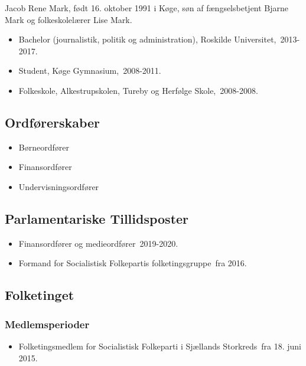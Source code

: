 \documentclass[11pt, a4paper]{awesome-cv}
\begin{document}
\makecvheader[R]
\makelettertitle
\begin{cvletter}
Jacob Rene Mark, født 16. oktober 1991 i Køge, søn af fængselsbetjent Bjarne Mark og folkeskolelærer Lise Mark.

\begin{itemize}
\item Bachelor (journalistik, politik og administration), Roskilde Universitet, 2013-2017.
\item Student, Køge Gymnasium, 2008-2011.
\item Folkeskole, Alkestrupskolen, Tureby og Herfølge Skole, 2008-2008.
\end{itemize}
\subsection*{Ordførerskaber}
\begin{itemize}
\item Børneordfører
\item Finansordfører
\item Undervisningsordfører
\end{itemize}
\subsection*{Parlamentariske Tillidsposter}
\begin{itemize}
\item Finansordfører og medieordfører 2019-2020.
\item Formand for Socialistisk Folkepartis folketingsgruppe fra 2016.
\end{itemize}
\subsection*{Folketinget}
\subsubsection*{Medlemsperioder}
\begin{itemize}
\item Folketingsmedlem for Socialistisk Folkeparti i Sjællands Storkreds fra 18. juni 2015.
\end{itemize}

\end{cvletter}
\end{document}
